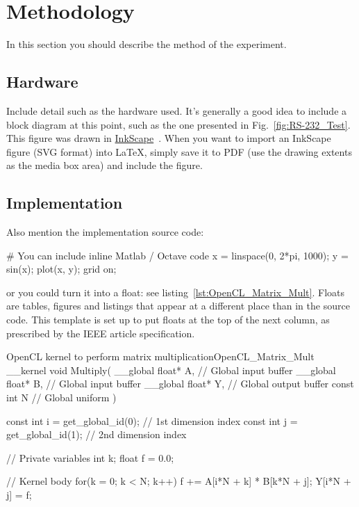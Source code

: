 \section{Methodology}

In this section you should describe the method of the experiment.

\subsection{Hardware}
Include detail such as the hardware used.  It's generally a good idea to include a block diagram at this point, such as the one presented in Fig.~\ref{fig:RS-232_Test}.  This figure was drawn in \href{http://www.inkscape.org/}{InkScape}~\cite{InkScape}.  When you want to import an InkScape figure (SVG format) into \LaTeX{}, simply save it to PDF (use the drawing extents as the media box area) and include the figure.


\subsection{Implementation}
Also mention the implementation source code:

\begin{Matlab}
# You can include inline Matlab / Octave code
x = linspace(0, 2*pi, 1000);
y = sin(x);
plot(x, y); grid on;
\end{Matlab}

or you could turn it into a float: see listing~\ref{lst:OpenCL_Matrix_Mult}.  Floats are tables, figures and listings that appear at a different place than in the source code.  This template is set up to put floats at the top of the next column, as prescribed by the IEEE article specification.

\begin{OpenCL_float}{OpenCL kernel to perform matrix multiplication}{OpenCL_Matrix_Mult}
__kernel void Multiply(
 __global float* A, // Global input buffer
 __global float* B, // Global input buffer
 __global float* Y, // Global output buffer
   const  int    N  // Global uniform
){
 const int i = get_global_id(0); // 1st dimension index
 const int j = get_global_id(1); // 2nd dimension index

 // Private variables
 int   k;
 float f = 0.0;

 // Kernel body
 for(k = 0; k < N; k++) f += A[i*N + k] * B[k*N + j];
 Y[i*N + j] = f;
}
\end{OpenCL_float}

